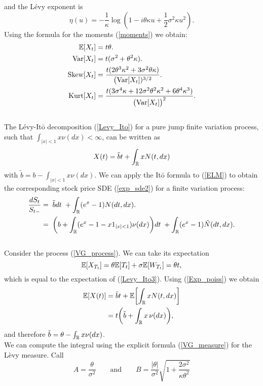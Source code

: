 and the Lévy exponent is 
\begin{equation}
 \eta(u) = -\frac{1}{\kappa} \log(1-i\theta \kappa u + \frac{1}{2} \sigma^2 \kappa u^2).
\end{equation}
Using the formula for the moments (\ref{moments}) we obtain:
\begin{align}\label{VG_cumulants}
 \mathbb{E}[X_t] &= t\theta. \\ \nonumber
 \mbox{Var}[X_t] &= t(\sigma^2 + \theta^2 \kappa). \\ \nonumber
 \mbox{Skew}[X_t] &= \frac{t (2\theta^3\kappa^2 + 3 \sigma^2 \theta \kappa)}{\bigl(\mbox{Var}[X_t])^{3/2}}. \\ \nonumber
 \mbox{Kurt}[X_t] &= \frac{t (3\sigma^4 \kappa + 12\sigma^2 \theta^2 \kappa^2 +6\theta^4\kappa^3)}{\bigl(\mbox{Var}[X_t]\bigr)^2}.\nonumber 
\end{align}
\\
The Lévy-It\={o} decomposition (\ref{Levy_Ito}) for a pure jump finite variation process, such that $\int_{|x|<1} x \nu(dx) < \infty$, 
can be written as
\begin{equation}\label{Levy_Ito3}
X(t) = \tilde b t + \int_{\mathbb{R}} x N(t,dx) 
\end{equation}
with $\tilde b = b - \int_{|x|<1} x \nu(dx)$. We can apply the It\={o} formula to (\ref{ELM}) to obtain the corresponding
stock price SDE (\ref{exp_sde2}) for a finite variation process: 
\begin{align}
 \frac{d S_t}{S_{t-}}  &= \; \tilde b dt \; + \int_{\mathbb{R}} (e^{x} - 1) N(dt,dx).  \\ \nonumber
                       &= \; \biggl( b + \int_{\mathbb{R}} (e^{x} -1 -x1_{|x|<1}) \nu(dx) \biggr) dt \; + \int_{\mathbb{R}} (e^{x} - 1) \tilde N(dt,dx).  
\end{align}
\\
Consider the process (\ref{VG_process}). We can take its expectation 
$$\mathbb{E}[X_{T_t}] = \theta \mathbb{E}[T_t] + \sigma \mathbb{E}[W_{T_t}] = \theta t,$$ 
which is equal to the expectation of (\ref{Levy_Ito3}). Using (\ref{Exp_poiss}) we obtain
\begin{align}
 \mathbb{E}[X(t)] &= \tilde b t + \mathbb{E} \biggl[ \int_{\mathbb{R}} x N(t,dx)\biggr] \\ \nonumber
	  &= t \biggl( \tilde b + \int_{\mathbb{R}} x \, \nu(dx) \biggr), \nonumber
\end{align}
and therefore $ \tilde b = \theta - \int_{\mathbb{R}} x \nu(dx) $.\\
We can compute the integral using the explicit formula (\ref{VG_measure}) for the Lèvy measure.
Call $$A = \frac{\theta}{\sigma^2} \hspace{2em} \mbox{and} \hspace{2em} 
B=\frac{|\theta|}{\sigma^2}\sqrt{1+\frac{2\sigma^2}{\kappa \theta^2}}$$

